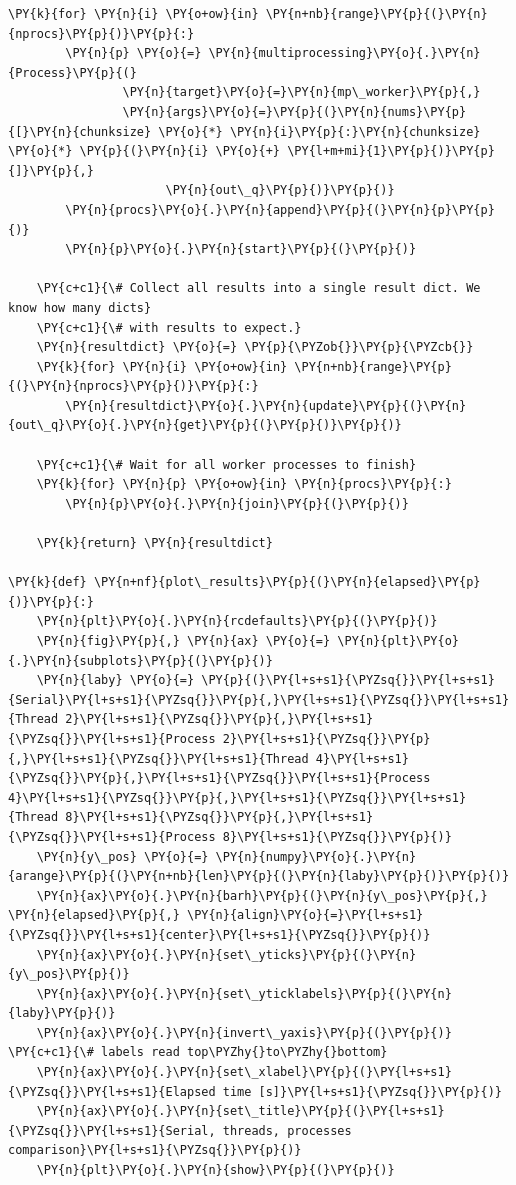 \begin{Verbatim}[label=\makebox{\url{https://github.com/lucabaldini/cmepda/tree/master/slides/latex/snippets/benchmark_comparison.py}},commandchars=\\\{\}]
    \PY{k}{for} \PY{n}{i} \PY{o+ow}{in} \PY{n+nb}{range}\PY{p}{(}\PY{n}{nprocs}\PY{p}{)}\PY{p}{:}
        \PY{n}{p} \PY{o}{=} \PY{n}{multiprocessing}\PY{o}{.}\PY{n}{Process}\PY{p}{(}
                \PY{n}{target}\PY{o}{=}\PY{n}{mp\_worker}\PY{p}{,}
                \PY{n}{args}\PY{o}{=}\PY{p}{(}\PY{n}{nums}\PY{p}{[}\PY{n}{chunksize} \PY{o}{*} \PY{n}{i}\PY{p}{:}\PY{n}{chunksize} \PY{o}{*} \PY{p}{(}\PY{n}{i} \PY{o}{+} \PY{l+m+mi}{1}\PY{p}{)}\PY{p}{]}\PY{p}{,}
                      \PY{n}{out\_q}\PY{p}{)}\PY{p}{)}
        \PY{n}{procs}\PY{o}{.}\PY{n}{append}\PY{p}{(}\PY{n}{p}\PY{p}{)}
        \PY{n}{p}\PY{o}{.}\PY{n}{start}\PY{p}{(}\PY{p}{)}

    \PY{c+c1}{\# Collect all results into a single result dict. We know how many dicts}
    \PY{c+c1}{\# with results to expect.}
    \PY{n}{resultdict} \PY{o}{=} \PY{p}{\PYZob{}}\PY{p}{\PYZcb{}}
    \PY{k}{for} \PY{n}{i} \PY{o+ow}{in} \PY{n+nb}{range}\PY{p}{(}\PY{n}{nprocs}\PY{p}{)}\PY{p}{:}
        \PY{n}{resultdict}\PY{o}{.}\PY{n}{update}\PY{p}{(}\PY{n}{out\_q}\PY{o}{.}\PY{n}{get}\PY{p}{(}\PY{p}{)}\PY{p}{)}

    \PY{c+c1}{\# Wait for all worker processes to finish}
    \PY{k}{for} \PY{n}{p} \PY{o+ow}{in} \PY{n}{procs}\PY{p}{:}
        \PY{n}{p}\PY{o}{.}\PY{n}{join}\PY{p}{(}\PY{p}{)}

    \PY{k}{return} \PY{n}{resultdict}

\PY{k}{def} \PY{n+nf}{plot\_results}\PY{p}{(}\PY{n}{elapsed}\PY{p}{)}\PY{p}{:}
    \PY{n}{plt}\PY{o}{.}\PY{n}{rcdefaults}\PY{p}{(}\PY{p}{)}
    \PY{n}{fig}\PY{p}{,} \PY{n}{ax} \PY{o}{=} \PY{n}{plt}\PY{o}{.}\PY{n}{subplots}\PY{p}{(}\PY{p}{)}
    \PY{n}{laby} \PY{o}{=} \PY{p}{(}\PY{l+s+s1}{\PYZsq{}}\PY{l+s+s1}{Serial}\PY{l+s+s1}{\PYZsq{}}\PY{p}{,}\PY{l+s+s1}{\PYZsq{}}\PY{l+s+s1}{Thread 2}\PY{l+s+s1}{\PYZsq{}}\PY{p}{,}\PY{l+s+s1}{\PYZsq{}}\PY{l+s+s1}{Process 2}\PY{l+s+s1}{\PYZsq{}}\PY{p}{,}\PY{l+s+s1}{\PYZsq{}}\PY{l+s+s1}{Thread 4}\PY{l+s+s1}{\PYZsq{}}\PY{p}{,}\PY{l+s+s1}{\PYZsq{}}\PY{l+s+s1}{Process 4}\PY{l+s+s1}{\PYZsq{}}\PY{p}{,}\PY{l+s+s1}{\PYZsq{}}\PY{l+s+s1}{Thread 8}\PY{l+s+s1}{\PYZsq{}}\PY{p}{,}\PY{l+s+s1}{\PYZsq{}}\PY{l+s+s1}{Process 8}\PY{l+s+s1}{\PYZsq{}}\PY{p}{)}
    \PY{n}{y\_pos} \PY{o}{=} \PY{n}{numpy}\PY{o}{.}\PY{n}{arange}\PY{p}{(}\PY{n+nb}{len}\PY{p}{(}\PY{n}{laby}\PY{p}{)}\PY{p}{)}
    \PY{n}{ax}\PY{o}{.}\PY{n}{barh}\PY{p}{(}\PY{n}{y\_pos}\PY{p}{,} \PY{n}{elapsed}\PY{p}{,} \PY{n}{align}\PY{o}{=}\PY{l+s+s1}{\PYZsq{}}\PY{l+s+s1}{center}\PY{l+s+s1}{\PYZsq{}}\PY{p}{)}
    \PY{n}{ax}\PY{o}{.}\PY{n}{set\_yticks}\PY{p}{(}\PY{n}{y\_pos}\PY{p}{)}
    \PY{n}{ax}\PY{o}{.}\PY{n}{set\_yticklabels}\PY{p}{(}\PY{n}{laby}\PY{p}{)}
    \PY{n}{ax}\PY{o}{.}\PY{n}{invert\_yaxis}\PY{p}{(}\PY{p}{)}  \PY{c+c1}{\# labels read top\PYZhy{}to\PYZhy{}bottom}
    \PY{n}{ax}\PY{o}{.}\PY{n}{set\_xlabel}\PY{p}{(}\PY{l+s+s1}{\PYZsq{}}\PY{l+s+s1}{Elapsed time [s]}\PY{l+s+s1}{\PYZsq{}}\PY{p}{)}
    \PY{n}{ax}\PY{o}{.}\PY{n}{set\_title}\PY{p}{(}\PY{l+s+s1}{\PYZsq{}}\PY{l+s+s1}{Serial, threads, processes comparison}\PY{l+s+s1}{\PYZsq{}}\PY{p}{)}
    \PY{n}{plt}\PY{o}{.}\PY{n}{show}\PY{p}{(}\PY{p}{)}


\end{Verbatim}
